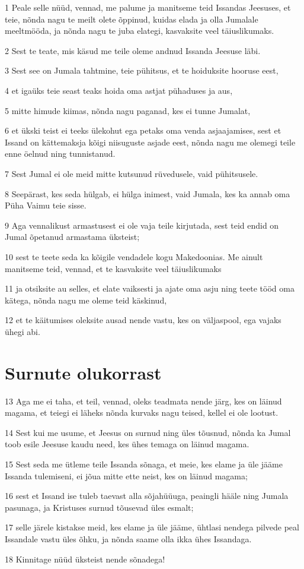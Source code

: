 \par 1 Peale selle nüüd, vennad, me palume ja manitseme teid Issandas Jeesuses, et teie, nõnda nagu te meilt olete õppinud, kuidas elada ja olla Jumalale meeltmööda, ja nõnda nagu te juba elategi, kasvaksite veel täiuslikumaks.
\par 2 Sest te teate, mis käsud me teile oleme andnud Issanda Jeesuse läbi.
\par 3 Sest see on Jumala tahtmine, teie pühitsus, et te hoiduksite hooruse eest,
\par 4 et igaüks teie seast teaks hoida oma astjat pühaduses ja aus,
\par 5 mitte himude kiimas, nõnda nagu paganad, kes ei tunne Jumalat,
\par 6 et ükski teist ei teeks ülekohut ega petaks oma venda asjaajamises, sest et Issand on kättemaksja kõigi niisuguste asjade eest, nõnda nagu me olemegi teile enne öelnud ning tunnistanud.
\par 7 Sest Jumal ei ole meid mitte kutsunud rüvedusele, vaid pühitsusele.
\par 8 Seepärast, kes seda hülgab, ei hülga inimest, vaid Jumala, kes ka annab oma Püha Vaimu teie sisse.
\par 9 Aga vennalikust armastusest ei ole vaja teile kirjutada, sest teid endid on Jumal õpetanud armastama üksteist;
\par 10 sest te teete seda ka kõigile vendadele kogu Makedoonias. Me ainult manitseme teid, vennad, et te kasvaksite veel täiuslikumaks
\par 11 ja otsiksite au selles, et elate vaiksesti ja ajate oma asju ning teete tööd oma kätega, nõnda nagu me oleme teid käskinud,
\par 12 et te käitumises oleksite ausad nende vastu, kes on väljaspool, ega vajaks ühegi abi.

\section*{Surnute olukorrast}

\par 13 Aga me ei taha, et teil, vennad, oleks teadmata nende järg, kes on läinud magama, et teiegi ei läheks nõnda kurvaks nagu teised, kellel ei ole lootust.
\par 14 Sest kui me usume, et Jeesus on surnud ning üles tõusnud, nõnda ka Jumal toob esile Jeesuse kaudu need, kes ühes temaga on läinud magama.
\par 15 Sest seda me ütleme teile Issanda sõnaga, et meie, kes elame ja üle jääme Issanda tulemiseni, ei jõua mitte ette neist, kes on läinud magama;
\par 16 sest et Issand ise tuleb taevast alla sõjahüüuga, peaingli hääle ning Jumala pasunaga, ja Kristuses surnud tõusevad üles esmalt;
\par 17 selle järele kistakse meid, kes elame ja üle jääme, ühtlasi nendega pilvede peal Issandale vastu üles õhku, ja nõnda saame olla ikka ühes Issandaga.
\par 18 Kinnitage nüüd üksteist nende sõnadega!



